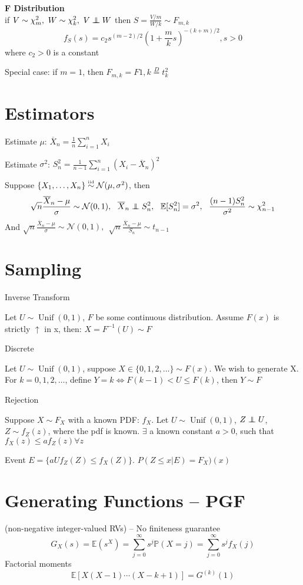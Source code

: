 \documentclass[twocolumn]{amsart}
\newcommand{\E}{\mathbb{E}}
\renewcommand{\P}{\mathbb{P}}
\newcommand{\Unif}{\operatorname{Unif}}
\newcommand\iid{\mathrel{\overset{\makebox[0pt]{\mbox{\normalfont\tiny iid}}}{\sim}}}
\newcommand\independent{\protect\mathpalette{\protect\independenT}{\perp}}
\def\independenT#1#2{\mathrel{\rlap{$#1#2$}\mkern3mu{#1#2}}}
\begin{document}
\textbf{F Distribution} \\
if $V \sim \chi^{2}_{m},~W \sim \chi^{2}_{k},~V \independent W$
then $S = \frac{V/m}{W/k} \sim F_{m,k}$
\begin{equation*}
  f_{S}(s) = c_{2}s^{(m-2)/2}(1+\frac{m}{k}s)^{-(k+m)/2},s>0
\end{equation*}
where $c_{2} > 0$ is a constant

Special case:
if \(m=1\), then $F_{m,k}=F{1,k} \stackrel{D}{=} t^{2}_{k}$

\section{Estimators}
Estimate $\mu$: $\overline{X}_{n} = \frac{1}{n}\sum_{i=1}^{n}X_{i}$

Estimate $\sigma^{2}$: $S_{n}^{2} = \frac{1}{n-1}\sum_{i=1}^{n}(X_{i}-\overline{X}_{n})^{2}$

Suppose $\{X_{1},\ldots,X_{n}\}\iid\mathcal{N}(\mu,\sigma^{2})$, then
\begin{equation*}
  \sqrt{n}\frac{\overline{X}_{n} - \mu}{\sigma}\sim\mathcal{N}(0,1),~~
  \overline{X}_{n}\independent S_{n}^{2},~~
  \E[S_{n}^{2}] = \sigma^{2},~~\frac{(n-1)S_{n}^{2}}{\sigma^{2}}\sim \chi^{2}_{n-1}
\end{equation*}
And
  $\sqrt{n}\frac{\overline{X}_{n} - \mu}{\sigma}\sim \mathcal{N}(0,1),~~
  \sqrt{n}\frac{\overline{X}_{n} - \mu}{S_{n}}\sim t_{n-1}$

\section{Sampling}
Inverse Transform

Let $U\sim\Unif(0, 1)$, $F$ be some continuous distribution. Assume $F(x)$ is strictly
$\uparrow$ in x, then: $X=F^{-1}(U)\sim F$

Discrete

Let $U\sim\Unif(0, 1)$, suppose $X\in\{0,1,2,\ldots\} \sim F(x)$. We wish to
generate X. For $k=0,1,2,\ldots$, define $Y=k\iff F(k-1)<U\leq F(k)$, then
$Y\sim F$

Rejection

Suppose $X\sim F_{X}$ with a known PDF: $f_{X}$. Let $U\sim\Unif(0,1)$,
$Z\independent U$, $Z\sim f_{Z}(z)$, where the pdf is known. $\exists$ a known
constant $a > 0$, such that $f_{X}(z)\leq a f_{Z}(z) \forall z$

Event $E=\{aUf_{Z}(Z)\leq f_{X}(Z)\}$. $P(Z\leq x | E) = F_{X})(x)$


\section{Generating Functions -- PGF}
(non-negative integer-valued RVs) -- No finiteness guarantee
\begin{equation*}
  G_{X}(s) = \E(s^{X}) = \sum_{j=0}^{\infty}s^{j}\P(X=j) = \sum_{j=0}^{\infty}s^{j}f_{X}(j)
\end{equation*}
Factorial moments
\begin{equation*}
  \E[X(X-1)\cdots(X-k+1)] = G^{(k)}(1)
\end{equation*}
\end{document}
